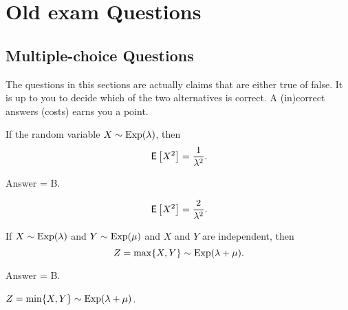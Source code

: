 \section{Old exam Questions}

\subsection{Multiple-choice Questions}

The questions in this sections are actually claims that are either true of false.
It is up to you to decide which of the two alternatives is correct.
A (in)correct answers (costs) earns you a point.

\begin{exercise}[201703] 
 If the random variable $X\sim\operatorname{Exp}(\lambda)$, then
 \begin{equation*}
 \,\mathsf{E}\left[X^2\right]= \frac{1}{\lambda^2}.
 \end{equation*}
\begin{solution}
 Answer = B.

 \begin{equation*}
 \,\mathsf{E}\left[X^2\right]= \frac{2}{\lambda^2}.
 \end{equation*}

\end{solution}
\end{exercise}

\begin{exercise}[201703]
 If $X\sim\operatorname{Exp}(\lambda)$ and $Y\sim\operatorname{Exp}(\mu)$ and $X$ and $Y$ are
 independent, then
 \begin{equation*}
Z=\max\{X,Y\}\sim\operatorname{Exp}(\lambda+\mu).
 \end{equation*}
\begin{solution}
 Answer = B.

$Z=\min\{X,Y\} \sim \operatorname{Exp}(\lambda+\mu)$.

\end{solution}
\end{exercise}

